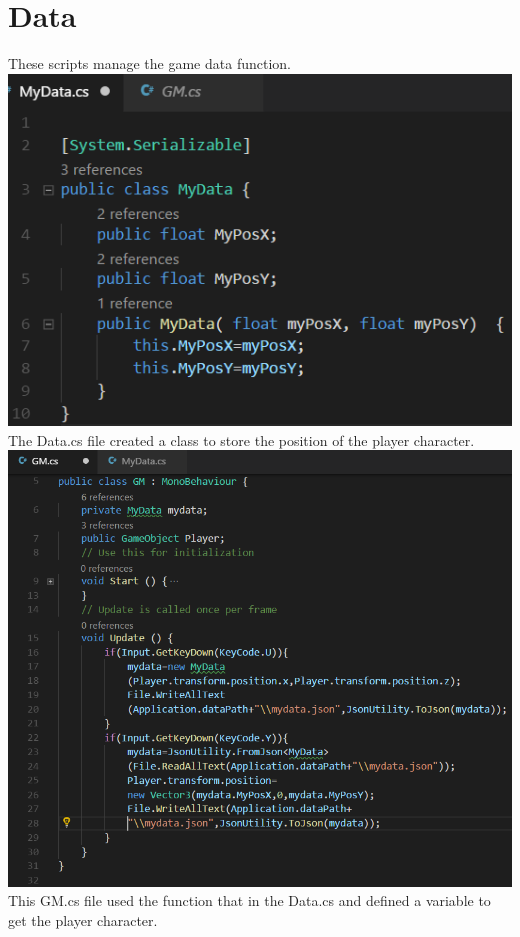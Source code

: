 \section{Data}
\begin{itemize}
These scripts manage the game data function.\\
\includegraphics[scale=0.5]{img/Data.png}\\
The Data.cs file created a class to store the position of the player character.\\
\includegraphics[scale=0.4]{img/GM.png}\\
This GM.cs file used the function that in the Data.cs and defined a variable to get the player character.\\

\end{itemize}
